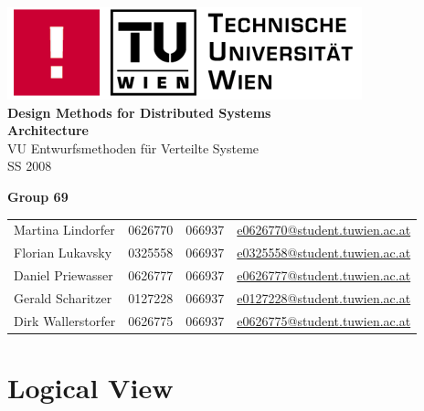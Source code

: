 \documentclass[a4paper]{article}
\begin{document}
\begin{titlepage}
	\bigskip
	\bigskip
	\bigskip
	\begin{center}
		\includegraphics{informatik-tuwien.png}\\
		\vspace{1cm}
		\Huge{\textsf{\textbf{Design Methods for Distributed Systems\\}}}
		\vspace{1cm}
		\huge{\textsf{\textbf{Architecture\\}}}
		\vspace{1cm}
		\LARGE{\textsf{VU Entwurfsmethoden f\"{u}r Verteilte Systeme\\}}
		\vspace{1cm}
		\Large{\textsf{SS 2008\\}}
	\end{center}
	\bigskip
	\begin{center}
		\large{\textsf{\textbf{Group 69}}}
	\end{center}
	\begin{tabular}{llll}
	\textsf{Martina Lindorfer} & \textsf{0626770} & \textsf{066937} & \url{e0626770@student.tuwien.ac.at}\\
	\textsf{Florian Lukavsky} & \textsf{0325558} & \textsf{066937} & \url{e0325558@student.tuwien.ac.at}\\
	\textsf{Daniel Priewasser} & \textsf{0626777} & \textsf{066937} & \url{e0626777@student.tuwien.ac.at}\\
	\textsf{Gerald Scharitzer} & \textsf{0127228} & \textsf{066937} & \url{e0127228@student.tuwien.ac.at}\\
	\textsf{Dirk Wallerstorfer} & \textsf{0626775} & \textsf{066937} & \url{e0626775@student.tuwien.ac.at}\\
	\end{tabular}
\end{titlepage}

\clearpage

\pagestyle{fancy}				
\cfoot{\small{\thepage\ / \pageref{LastPage}}}

\tableofcontents

\newpage
\section{Logical View}
\end{document}
